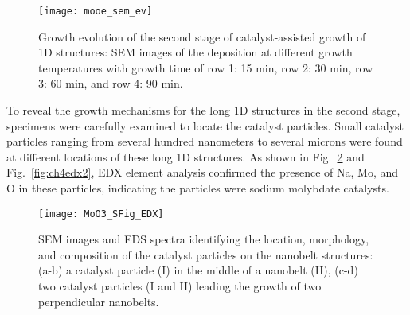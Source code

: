 \begin{figure}[htb]
\centering
\texttt{[image: mooe\_sem\_ev]}
\caption[Growth evolution of the second stage of catalyst-assisted growth of  1D structures]{Growth evolution of the second stage of catalyst-assisted growth of  1D structures: SEM images of the deposition at different growth temperatures with growth time of row 1: 15 min, row 2: 30 min, row 3: 60 min, and row 4: 90 min.}
\label{fig:ch4ev}
\end{figure}
To reveal the growth mechanisms for the long 1D structures in the second stage, specimens were carefully examined to locate the catalyst particles. Small catalyst particles ranging from several hundred nanometers to several microns were found at different locations of these long 1D structures. As shown in Fig.~\ref{fig:ch4edx1} and Fig.~\ref{fig:ch4edx2}, EDX element analysis confirmed the presence of Na, Mo, and O in these particles, indicating the particles were sodium molybdate catalysts.  

\begin{figure}[htb]
\centering
\texttt{[image: MoO3\_SFig\_EDX]}
\caption[SEM images and EDS spectra identifying the location, morphology, and composition of the catalyst particles on the nanobelt structures]{SEM images and EDS spectra identifying the location, morphology, and composition of the catalyst particles on the nanobelt structures: (a-b) a catalyst particle (I) in the middle of a nanobelt (II), (c-d) two catalyst particles (I and II) leading the growth of two perpendicular nanobelts.}
\label{fig:ch4edx1}
\end{figure}


